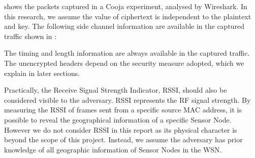  shows the packets captured in a Cooja experiment, analysed by Wireshark\cite{Wireshark}. In this research, we assume the value of ciphertext is independent to the plaintext and key. The following side channel information are available in the captured traffic shown in :

\begin{description}[style=nextline]
	\item[Unencrypted headers]
	
	\item[Timing]
	\item[Length]
\end{description}

The timing and length information are always available in the captured traffic. The unencrypted headers depend on the security measure adopted, which we explain in later sections.

Practically, the Receive Signal Strength Indicator, RSSI, should also be considered visible to the adversary. RSSI represents the RF signal strength. By measuring the RSSI of frames sent from a specific source MAC address,  it is possible to reveal the geographical information of a specific Sensor Node. However we do not consider RSSI in this report as its physical character is beyond the scope of this project. Instead, we assume the adversary has prior knowledge of all geographic information of Sensor Nodes in the WSN.

